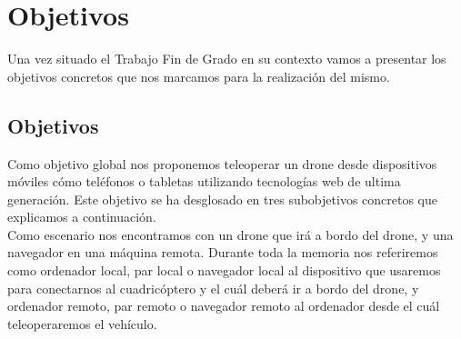 \chapter{Objetivos}

Una vez situado el Trabajo Fin de Grado en su contexto vamos a presentar los objetivos concretos que nos marcamos para la realización del mismo.


\section{Objetivos}

Como objetivo global nos proponemos teleoperar un drone desde dispositivos móviles cómo teléfonos o tabletas utilizando tecnologías web de ultima generación. Este objetivo se ha desglosado en tres subobjetivos concretos que explicamos a continuación.\\

Como escenario nos encontramos con un drone que irá a bordo del drone, y una navegador en una máquina remota. Durante toda la memoria nos referiremos como ordenador local, par local o navegador local al dispositivo que usaremos para conectarnos al cuadricóptero y el cuál deberá ir a bordo del drone, y ordenador remoto, par remoto o navegador remoto al ordenador desde el cuál teleoperaremos el vehículo.\\


